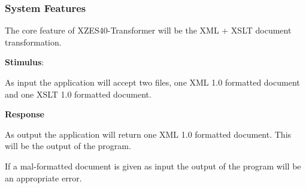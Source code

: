 


\subsubsection{System Features}



The core feature of XZES40-Transformer will be the XML + XSLT document transformation.

\begin{description}
  \item{
    \textbf{Stimulus}:

    As input the application will accept two files, one XML 1.0 formatted document and one XSLT 1.0 formatted document.
  }
  \item{
  \textbf{Response}

  As output the application will return one XML 1.0 formatted document.
  This will be the output of the program.

  If a mal-formatted document is given as input the output of the program will be an appropriate error.
  }
\end{description}

